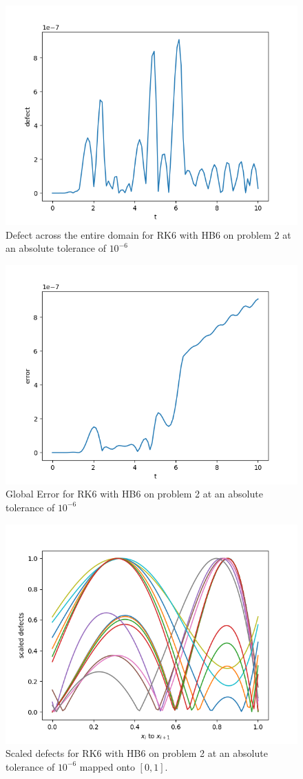 \begin{figure}[H]
\centering
\includegraphics[width=0.7\linewidth]{./figures/rk6_with_hb6_p2_global_defect}
\caption{Defect across the entire domain for RK6 with HB6 on problem 2 at an absolute tolerance of $10^{-6}$}
\label{fig:rk6_with_hb6_p2_global_defect}
\end{figure}

\begin{figure}[H]
\centering
\includegraphics[width=0.7\linewidth]{./figures/rk6_with_hb6_p2_global_error}
\caption{Global Error for RK6 with HB6 on problem 2 at an absolute tolerance of $10^{-6}$}
\label{fig:rk6_with_hb6_p2_global_error}
\end{figure}

\begin{figure}[H]
\centering
\includegraphics[width=0.7\linewidth]{./figures/rk6_with_hb6_p2_scaled_defects}
\caption{Scaled defects for RK6 with HB6 on problem 2 at an absolute tolerance of $10^{-6}$ mapped onto $[0, 1]$.}
\label{fig:rk6_with_hb6_p2_scaled_defects}
\end{figure}

